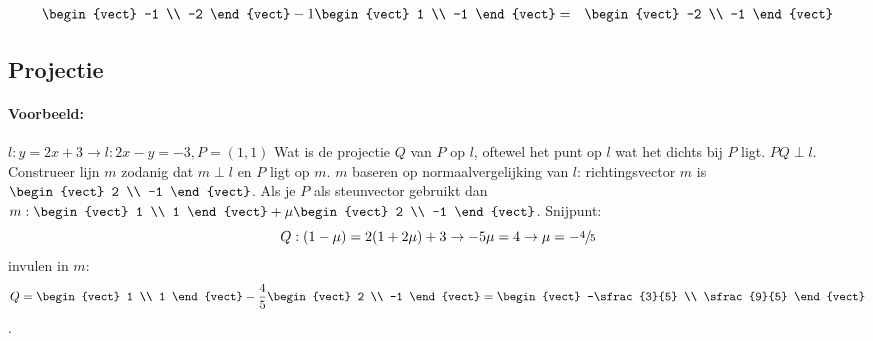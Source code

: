 \begin{enumerate}
\begin{eqnarray*}
		\begin{vect} -1 \\ -2 \end{vect} -1 \begin{vect} 1 \\ -1 \end{vect} &=& \begin{vect} -2 \\ -1 \end{vect}
	\end{eqnarray*}
\end{enumerate}

\subsection{Projectie}
\paragraph{Voorbeeld:} $l: y = 2x+3 \to l: 2x-y=-3, P=(1,1)$ Wat is de projectie $Q$ van $P$ op $l$,  oftewel het punt op $l$ wat het dichts bij $P$ ligt. $PQ \perp l$. Construeer lijn $m$ zodanig dat $m \perp l$ en $P$ ligt op $m$. $m$ baseren op normaalvergelijking van $l$: richtingsvector $m$ is $\begin{vect} 2 \\ -1 \end{vect}$. Als je $P$ als steunvector gebruikt dan $m: \begin{vect} 1 \\ 1 \end{vect} + \mu \begin{vect} 2 \\ -1 \end{vect}$. Snijpunt:
\[ Q: (1-\mu) = 2(1+2\mu)+3 \to -5\mu = 4 \to \mu = -\sfrac{4}{5} \]
invulen in $m:$
\[ Q = \begin{vect} 1 \\ 1 \end{vect} - \frac{4}{5} \begin{vect} 2 \\ -1 \end{vect} = \begin{vect} -\sfrac{3}{5} \\ \sfrac{9}{5} \end{vect} \].

